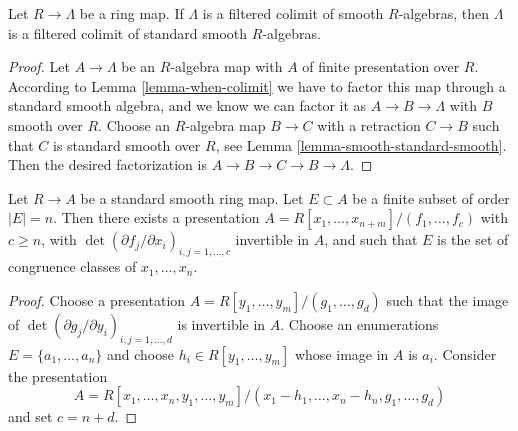 \begin{lemma}
\label{lemma-colimit-standard-smooth}
Let $R \to \Lambda$ be a ring map. If $\Lambda$ is a filtered colimit of
smooth $R$-algebras, then $\Lambda$ is a filtered colimit of standard
smooth $R$-algebras.
\end{lemma}

\begin{proof}
Let $A \to \Lambda$ be an $R$-algebra map with $A$
of finite presentation over $R$. According to
Lemma \ref{lemma-when-colimit}
we have to factor this map through a standard smooth algebra, and
we know we can factor it as $A \to B \to \Lambda$ with $B$ smooth
over $R$. Choose an $R$-algebra map $B \to C$ with a retraction
$C \to B$ such that $C$ is standard smooth over $R$, see
Lemma \ref{lemma-smooth-standard-smooth}.
Then the desired factorization is $A \to B \to C \to B \to \Lambda$.
\end{proof}

\begin{lemma}
\label{lemma-standard-smooth-include-generators}
Let $R \to A$ be a standard smooth ring map.
Let $E \subset A$ be a finite subset of order $|E| = n$.
Then there exists a presentation
$A = R[x_1, \ldots, x_{n + m}]/(f_1, \ldots, f_c)$ with $c \geq n$,
with $\det(\partial f_j/\partial x_i)_{i, j = 1, \ldots, c}$
invertible in $A$, and such that $E$ is the set of congruence classes of
$x_1, \ldots, x_n$.
\end{lemma}

\begin{proof}
Choose a presentation $A = R[y_1, \ldots, y_m]/(g_1, \ldots, g_d)$
such that the image of
$\det(\partial g_j/\partial y_i)_{i, j = 1, \ldots, d}$
is invertible in $A$. Choose an enumerations $E = \{a_1, \ldots, a_n\}$
and choose $h_i \in R[y_1, \ldots, y_m]$ whose image in $A$ is $a_i$.
Consider the presentation
$$
A = R[x_1, \ldots, x_n, y_1, \ldots, y_m]/
(x_1 - h_1, \ldots, x_n - h_n, g_1, \ldots, g_d)
$$
and set $c = n + d$.
\end{proof}

